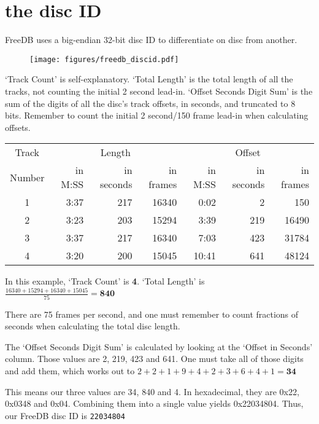 \pagebreak

\section{the disc ID}
FreeDB uses a big-endian 32-bit disc ID to differentiate
on disc from another.

\begin{figure}[h]
\texttt{[image: figures/freedb\_discid.pdf]}
\end{figure}
\par
\noindent
`Track Count' is self-explanatory.
`Total Length' is the total length of all the tracks, not
counting the initial 2 second lead-in.
`Offset Seconds Digit Sum' is the sum of the digits of all
the disc's track offsets, in seconds, and truncated to 8 bits.
Remember to count the initial 2 second/150 frame lead-in when calculating
offsets.
\begin{table}[h]
\begin{tabular}{|c||r|r|r||r|r|r|}
\hline
Track & \multicolumn{3}{c||}{Length} & \multicolumn{3}{c|}{Offset} \\
Number & in M:SS & in seconds & in frames & in M:SS & in seconds & in frames \\
\hline
1 & 3:37 & 217 & 16340 & 0:02 & 2 & 150 \\
2 & 3:23 & 203 & 15294 & 3:39 & 219 & 16490 \\
3 & 3:37 & 217 & 16340 & 7:03 & 423 & 31784 \\
4 & 3:20 & 200 & 15045 & 10:41 & 641 & 48124 \\
\hline
\end{tabular}
\end{table}
\par
\noindent
In this example, `Track Count' is \textbf{4}.
`Total Length' is
$\frac{16340 + 15294 + 16340 + 15045}{75} = \textbf{840}$

There are 75 frames per second, and one must remember to count
fractions of seconds when calculating the total disc length.

The `Offset Seconds Digit Sum' is calculated by looking at the
`Offset in Seconds' column.
Those values are 2, 219, 423 and 641.
One must take all of those digits and add them, which works out to
$2 + 2 + 1 + 9 + 4 + 2 + 3 + 6 + 4 + 1 = \textbf{34}$

This means our three values are 34, 840 and 4.
In hexadecimal, they are 0x22, 0x0348 and 0x04.
Combining them into a single value yields 0x22034804.
Thus, our FreeDB disc ID is \texttt{22034804}
